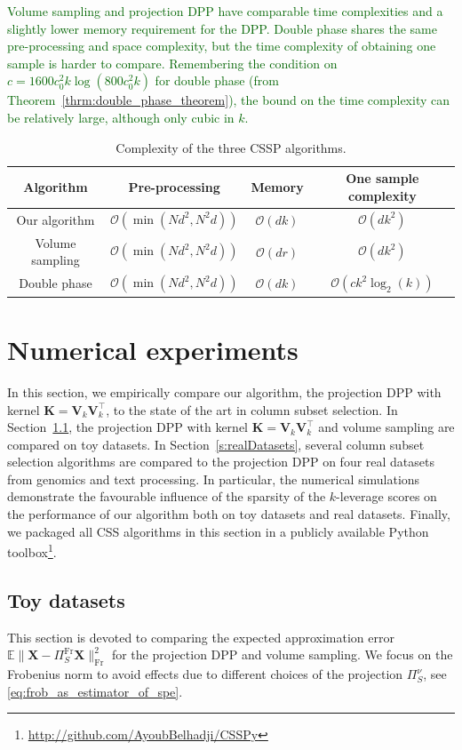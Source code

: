 \documentclass[twoside,11pt]{book}
\newcommand{\rev}[1]{\textcolor{darkgreen}{#1}}
\numberwithin{theorem}{chapter}
\numberwithin{definition}{chapter}
\numberwithin{proposition}{chapter}
\numberwithin{corollary}{chapter}
\numberwithin{example}{chapter}
\numberwithin{lemma}{chapter}
\numberwithin{assumption}{chapter}
\DeclareMathOperator{\Fr}{\mathrm{Fr}}
\DeclareMathOperator{\Tran}{\intercal}
\begin{document}
\rev{Volume sampling and projection DPP have comparable time complexities and a slightly lower memory requirement for the DPP. Double phase shares the same pre-processing and space complexity, but the time complexity of obtaining one sample is harder to compare. Remembering the condition on $c = 1600 c_{0}^{2}k \log(800 c_{0}^{2} k)$ for double phase (from Theorem~\ref{thrm:double_phase_theorem}), the bound on the time complexity can be relatively large, although only cubic in $k$.}
\begin{table}
\centering
 \begin{tabular}{| c| c| c| c|}
 \hline
  Algorithm & Pre-processing & Memory & One sample complexity\\
 \hline
 Our algorithm & $\mathcal{O}(\min(N d^{2},N^{2}d))$ & $\mathcal{O}(dk)$ & $\mathcal{O}(dk^{2})$\\
 \hline
 Volume sampling & $\mathcal{O}(\min(N d^{2},N^{2}d))$ & $\mathcal{O}(dr)$ & $\mathcal{O}(dk^{2})$ \\
 \hline
 Double phase  & $\mathcal{O}(\min(N d^{2},N^{2}d))$ & $\mathcal{O}(dk)$ & $\mathcal{O}(c k^{2} \log_{2}(k))$\\
 \hline
\end{tabular}
\caption{Complexity of the three CSSP algorithms.\label{table:CSSP_complexity}}
\end{table}


\section{Numerical experiments}

In this section, we empirically compare our algorithm, the projection DPP with kernel $\bm{K}=\bm{V}_k\bm{V}_k^{\Tran}$, to the state of the art in column subset selection. In Section~\ref{s:toyDatasets}, the projection DPP with kernel $\bm{K}=\bm{V}_k\bm{V}_k^{\Tran}$ and volume sampling are compared on toy datasets. In Section~\ref{s:realDatasets}, several column subset selection algorithms are compared to the projection DPP on four real datasets from genomics and text processing. In particular, the numerical simulations demonstrate the favourable influence of the sparsity of the $k$-leverage scores on the performance of our algorithm both on toy datasets and real datasets. Finally, we packaged all CSS algorithms in this section in a publicly available Python toolbox\footnote{\url{http://github.com/AyoubBelhadji/CSSPy}}.

\subsection{Toy datasets}
\label{s:toyDatasets}
This section is devoted to comparing the expected approximation error $\mathbb{E} \|\bm{X}- \Pi_{S}^{\Fr} \bm{X}\|_{\Fr}^{2}$ for the projection DPP and volume sampling. We focus on the Frobenius norm to avoid effects due to different choices of the projection $\Pi_{S}^{\nu}$, see \eqref{eq:frob_as_estimator_of_spe}.
\end{document}
